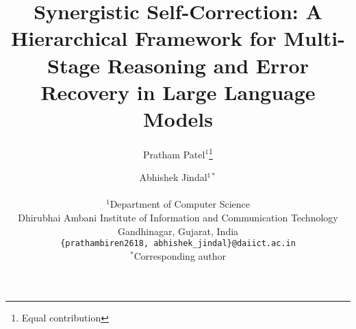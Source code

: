 \documentclass[10pt,twocolumn]{article}
\begin{document}
\title{Synergistic Self-Correction: A Hierarchical Framework for Multi-Stage Reasoning and Error Recovery in Large Language Models}

\author{
  Pratham Patel$^{1}$\thanks{Equal contribution} \and
  Abhishek Jindal$^{1*}$ \\
  \\
  $^1$Department of Computer Science \\
  Dhirubhai Ambani Institute of Information and Communication Technology \\
  Gandhinagar, Gujarat, India \\
  \texttt{\{prathambiren2618, abhishek\_jindal\}@daiict.ac.in} \\
  $^*$Corresponding author
}

\maketitle
\end{document}
